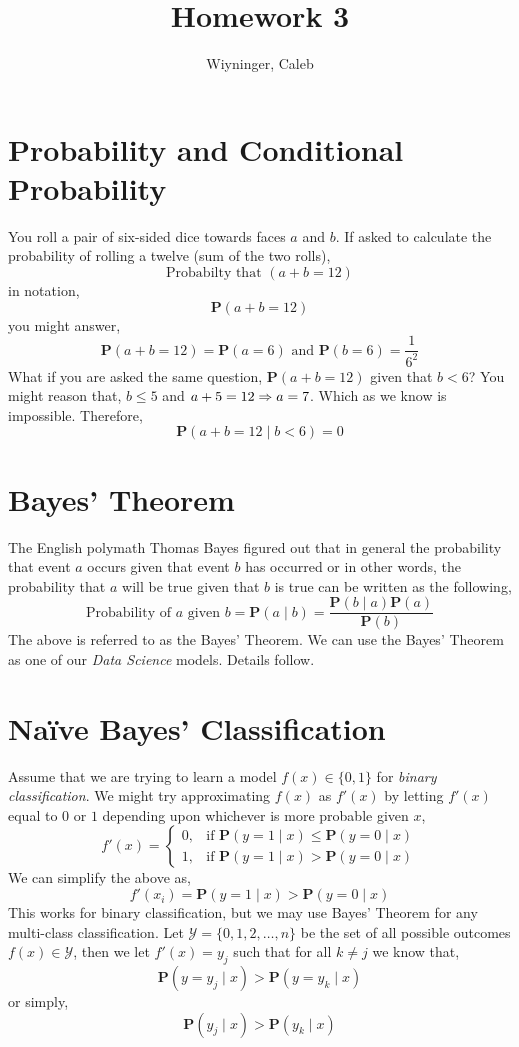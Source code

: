 \documentclass{homework}
\author{Wiyninger, Caleb}  %
\title{Homework 3}
\renewcommand\P{\mathbf{P}}
\newcommand\Y{\mathcal{Y}}
\begin{document}
 \maketitle

\section{Probability and Conditional Probability}

You roll a pair of six-sided dice towards faces $a$ and $b$. If asked
to calculate the probability of rolling a twelve (sum of the two
rolls),
\[
  \text{Probabilty that }(a+b=12)
\]
in notation,
\[
  \P(a+b=12)
\]
you might answer,
\[
  \P(a+b=12) = \P(a = 6) \text{ and } \P(b = 6) = \frac{1}{6^2}
\]
What if you are asked the same question, $\P(a+b=12)$ given that
$b < 6$? You might reason that, $b \leq 5$ and $a+5=12 \Rightarrow a =
  7$. Which as we know is impossible. Therefore,
\[
  \P(a+b=12 \mid b < 6) = 0
\]

\section{Bayes' Theorem}

The English polymath Thomas Bayes figured out that in general the
probability that event $a$ occurs given that event $b$ has occurred or
in other words, the probability that $a$ will be true given that $b$
is true can be written as the following,
\[
  \text{Probability of } a \text{ given } b =
  \P(a \mid b) = \frac{\P(b \mid a)\P(a)}{\P(b)}
\]
The above is referred to as the Bayes' Theorem. We can use the Bayes'
Theorem as one of our \textit{Data Science} models. Details follow.

\section{Na\"ive Bayes' Classification}

Assume that we are trying to learn a model $f(x) \in \{0, 1\}$ for
\textit{binary classification}. We might try approximating $f(x)$ as
$f'(x)$ by letting $f'(x)$ equal to $0$ or $1$ depending upon
whichever is more probable given $x$,
\[
  f'(x) =
  \begin{cases}
    0, & \text{if } \P(y=1 \mid x) \leq \P(y=0 \mid x) \\
    1, & \text{if } \P(y=1 \mid x) > \P(y=0 \mid x)
  \end{cases}
\]
We can simplify the above as,
\[
  f'(x_i) = \P(y=1 \mid x) > \P(y=0 \mid x)
\]
This works for binary classification, but we may use Bayes' Theorem
for any multi-class classification. Let $\Y = \{0, 1, 2,\hdots, n\}$
be the set of all possible outcomes \ie $f(x) \in \Y$, then we let
$f'(x) = y_j$ such that for all $k \neq j$ we know that,
\[
  \P(y=y_j \mid x) >  \P(y=y_k \mid x)
\]
or simply,
\[
  \P(y_j \mid x) >  \P(y_k \mid x)
\]
\end{document}
